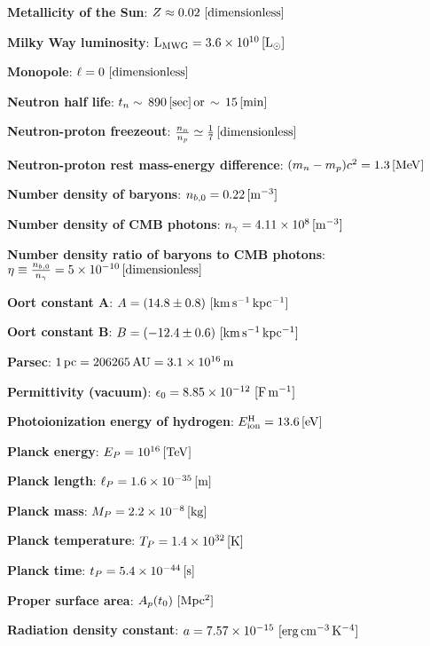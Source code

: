 \documentclass[a4paper,10pt]{article}
\begin{document}
{\noindent}\textbf{Metallicity of the Sun}: $Z\approx0.02 ~ [{\rm dimensionless}]$

{\noindent}\textbf{Milky Way luminosity}: ${\rm L_{MWG}} = 3.6\times10^{10}\,[{\rm L}_\odot]$

{\noindent}\textbf{Monopole}: $\ell=0 ~ [{\rm dimensionless}]$

{\noindent}\textbf{Neutron half life}: $t_n\sim\,890\,[{\rm sec}]\,{\rm or}\,\sim\,15\,[{\rm min}]$

{\noindent}\textbf{Neutron-proton freezeout}: $\frac{n_n}{n_p} \simeq \frac{1}{7}\,[{\rm dimensionless}]$

{\noindent}\textbf{Neutron-proton rest mass-energy difference}: $(m_n-m_p)c^2 = 1.3\,[{\rm MeV}]$

{\noindent}\textbf{Number density of baryons}: $n_{b,0} = 0.22\,[{\rm m^{-3}}]$

{\noindent}\textbf{Number density of CMB photons}: $n_\gamma= 4.11\times10^8\,[{\rm m^{-3}}]$

{\noindent}\textbf{Number density ratio of baryons to CMB photons}: $\eta \equiv \frac{n_{b,0}}{n_\gamma} = 5\times10^{-10}\,[{\rm dimensionless}]$

{\noindent}\textbf{Oort constant A}: $A = (14.8\pm0.8) ~ [{\rm km\,s^{-1}\,kpc^{-1}}]$

{\noindent}\textbf{Oort constant B}: $B = (-12.4\pm0.6) ~ [{\rm km\,s^{-1}\,kpc^{-1}}]$

{\noindent}\textbf{Parsec}: $1\,{\rm pc} = 206265\,{\rm AU} = 3.1\times10^{16}\,{\rm m}$

{\noindent}\textbf{Permittivity (vacuum)}: $\epsilon_0 = 8.85\times10^{-12} ~ [{\rm F\,m^{-1}}]$

{\noindent}\textbf{Photoionization energy of hydrogen}: $E^\mathrm{H}_\mathrm{ion} = 13.6\,[{\rm eV}]$

{\noindent}\textbf{Planck energy}: $E_P = 10^{16}\,[{\rm TeV}]$

{\noindent}\textbf{Planck length}: $\ell_P = 1.6\times10^{-35}\,[{\rm m}]$

{\noindent}\textbf{Planck mass}: $M_P = 2.2\times10^{-8}\,[{\rm kg}]$

{\noindent}\textbf{Planck temperature}: $T_P = 1.4\times10^{32}\,[{\rm K}]$

{\noindent}\textbf{Planck time}: $t_P = 5.4\times10^{-44}\,[{\rm s}]$

{\noindent}\textbf{Proper surface area}: $A_p(t_0) ~ [{\rm Mpc^2}]$

{\noindent}\textbf{Radiation density constant}: $a=7.57\times10^{-15} ~ [{\rm erg\,cm^{-3}\,K^{-4}}]$
\end{document}
